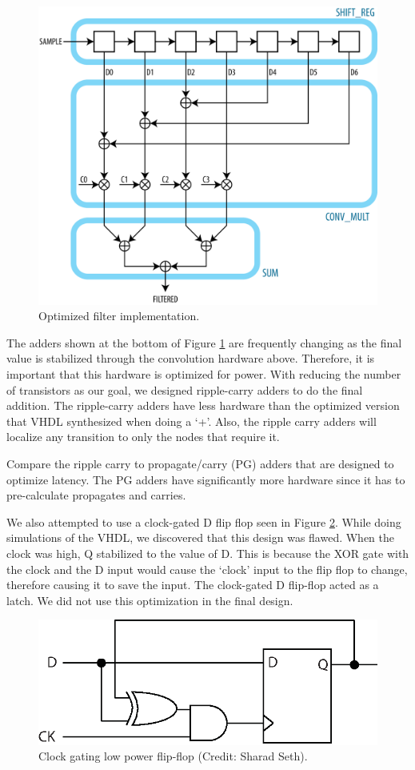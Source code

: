 \begin{figure}[ht]
\centering
\includegraphics[width=5in]{images/filter_filtered}
\caption{Optimized filter implementation.}
\label{fig:optimizedfilter}
\end{figure}

The adders shown at the bottom of Figure \ref{fig:optimizedfilter} are frequently changing as the final value is stabilized through the convolution hardware above.  Therefore, it is important that this hardware is optimized for power.  With reducing the number of transistors as our goal, we designed ripple-carry adders to do the final addition.  The ripple-carry adders have less hardware than the optimized version that VHDL synthesized when doing a `+'.  Also, the ripple carry adders will localize any transition to only the nodes that require it.

Compare the ripple carry to propagate/carry (PG) adders that are designed to optimize latency.  The PG adders have significantly more hardware since it has to pre-calculate propagates and carries.  

We also attempted to use a clock-gated D flip flop seen in Figure \ref{fig:gateclocked}.  While doing simulations of the VHDL, we discovered that this design was flawed.  When the clock was high, Q stabilized to the value of D.  This is because the XOR gate with the clock and the D input would cause the `clock' input to the flip flop to change, therefore causing it to save the input.  The clock-gated D flip-flop acted as a latch.  We did not use this optimization in the final design.


\begin{figure}[ht]
\centering
\includegraphics[width=5in]{images/clockgating}
\caption{Clock gating low power flip-flop (Credit: Sharad Seth).}
\label{fig:gateclocked}
\end{figure}



